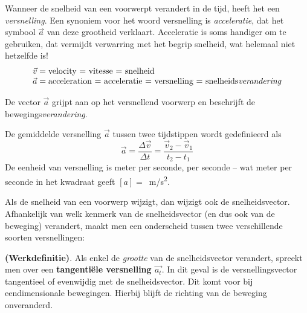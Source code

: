 \documentclass{ximera}
\begin{document}
	\author{Bart Lambregs, Vincent Gellens}
    \xmsource\xmuitleg

	
Wanneer de snelheid van een voorwerpt verandert in de tijd, heeft het een \textit{versnelling}. 
Een synoniem voor het woord versnelling is \textit{acceleratie}, dat het symbool \(\vec{a}\) van deze grootheid verklaart. 
Acceleratie is soms handiger om te gebruiken, dat vermijdt verwarring met het begrip snelheid, wat helemaal niet hetzelfde is!
\[
\begin{array}{l}
	\vec{v} = \text{velocity = vitesse = snelheid} \\
	\vec{a} = \text{acceleration = acceleratie = versnelling = snelheids}\emph{verandering}
\end{array}
\]

De vector \(\vec{a}\) grijpt aan op het versnellend voorwerp en beschrijft de bewegings\textit{verandering}.

\begin{definition}

De gemiddelde versnelling \(\vec{a}\) tussen twee tijdstippen wordt gedefinieerd als
\[
\vec{a}=\frac{\Delta \vec{v}}{\Delta t}=\frac{\vec{v}_2-\vec{v}_1}{t_2-t_1}
\]
De eenheid van versnelling is meter per seconde, per seconde -- wat meter per seconde in het kwadraat geeft $[a]=$\SI{}{m/s^2}.
\end{definition}

Als de snelheid van een voorwerp wijzigt, dan wijzigt ook de snelheidsvector. 
Afhankelijk van welk kenmerk van de snelheidsvector (en dus ook van de beweging) verandert, maakt men een onderscheid tussen twee verschillende soorten versnellingen:

\begin{definition}{\textbf{(Werkdefinitie)}.}
Als enkel de \textit{grootte} van de snelheidsvector verandert, spreekt men over een \textbf{tangentiële versnelling \(\vec{a_t}\)}. In dit geval is de versnellingsvector tangentieel of evenwijdig met de snelheidsvector. Dit komt voor bij eendimensionale bewegingen. Hierbij blijft de richting van de beweging onveranderd.
\end{definition}
\end{document}
